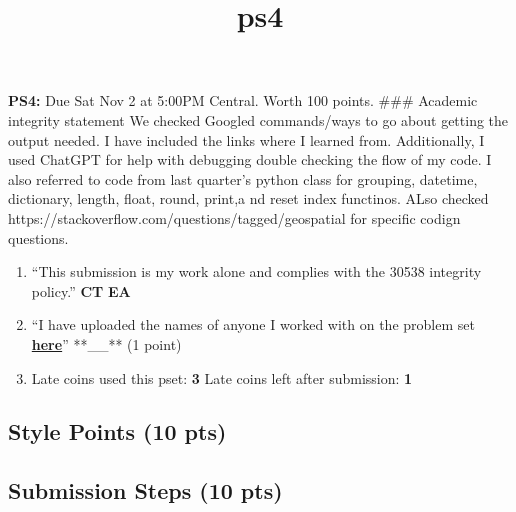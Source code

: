\documentclass[
  letterpaper,
  DIV=11,
  numbers=noendperiod]{scrartcl}
\title{ps4}
\author{}
\date{}
\providecommand{\tightlist}{%
  \setlength{\itemsep}{0pt}\setlength{\parskip}{0pt}}\usepackage{longtable,booktabs,array}
\begin{document}
\maketitle



\textbf{PS4:} Due Sat Nov 2 at 5:00PM Central. Worth 100 points. \#\#\#
Academic integrity statement We checked Googled commands/ways to go
about getting the output needed. I have included the links where I
learned from. Additionally, I used ChatGPT for help with debugging
double checking the flow of my code. I also referred to code from last
quarter's python class for grouping, datetime, dictionary, length,
float, round, print,a nd reset index functinos. ALso checked
https://stackoverflow.com/questions/tagged/geospatial for specific
codign questions.

\begin{enumerate}
\def\labelenumi{\arabic{enumi}.}
\tightlist
\item
  ``This submission is my work alone and complies with the 30538
  integrity policy.'' \textbf{CT} \textbf{EA}
\item
  ``I have uploaded the names of anyone I worked with on the problem set
  \textbf{\href{https://docs.google.com/forms/d/1-zzHx762odGlpVWtgdIC55vqF-j3gqdAp6Pno1rIGK0/edit}{here}}''
  **\_\_** (1 point)
\item
  Late coins used this pset: \textbf{3} Late coins left after
  submission: \textbf{1}
\end{enumerate}

\subsection{Style Points (10 pts)}\label{style-points-10-pts}

\subsection{Submission Steps (10 pts)}\label{submission-steps-10-pts}
\end{document}
